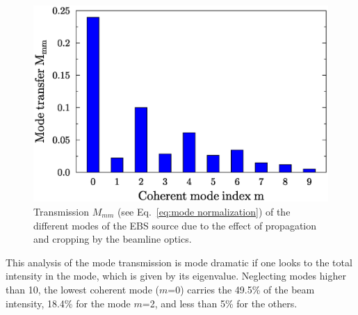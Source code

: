 \documentclass{iucr}              %
\begin{document}

\begin{figure}\label{fig:mode transmission}
    \centering
        \includegraphics[width=\textwidth]{GRAPHICS/propagated_modes.eps}
    \caption{Transmission $M_{mm}$ (see Eq.~\ref{eq:mode normalization}) of the different modes of the EBS source  due to the effect of propagation and cropping by the beamline optics.}
\end{figure}

This analysis of the mode transmission is mode dramatic if one looks to the total intensity in the mode, which is given by its eigenvalue. Neglecting modes higher than 10, the lowest coherent mode ($m$=0) carries the 49.5\% of the beam intensity, 18.4\% for the mode $m$=2, and less than 5\% for the others. 
\end{document}
